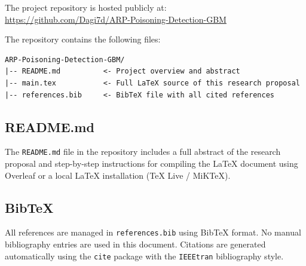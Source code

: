 \documentclass[12pt,a4paper]{article}
\begin{document}
The project repository is hosted publicly at:\\
\url{https://github.com/Dagi7d/ARP-Poisoning-Detection-GBM}

The repository contains the following files:

\begin{verbatim}
ARP-Poisoning-Detection-GBM/
|-- README.md          <- Project overview and abstract
|-- main.tex           <- Full LaTeX source of this research proposal
|-- references.bib     <- BibTeX file with all cited references
\end{verbatim}

\subsection{README.md}

The \texttt{README.md} file in the repository includes a full abstract of the
research proposal and step-by-step instructions for compiling the LaTeX document
using Overleaf or a local LaTeX installation (TeX Live / MiKTeX).

\subsection{BibTeX}

All references are managed in \texttt{references.bib} using BibTeX format.
No manual bibliography entries are used in this document. Citations are generated
automatically using the \texttt{cite} package with the \texttt{IEEEtran}
bibliography style.

\newpage


\end{document}
